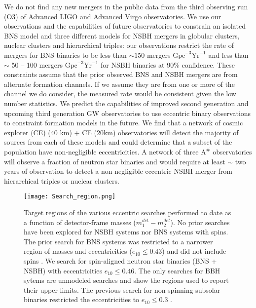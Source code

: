 \documentclass[floatfix,lengthcheck,showpacs,amssymb,amsmath,amsfonts,twocolumn,nofootinbib,longbibliography]{revtex4-1}
\begin{document}
We do not find any new mergers in the public data from the third observing run (O3) of Advanced LIGO and Advanced Virgo observatories. We use our observations and the capabilities of future observatories to constrain an isolated BNS model and three different models for NSBH mergers in globular clusters, nuclear clusters and hierarchical triples: our observations restrict the rate of mergers for BNS binaries to be less than $\sim 150$ mergers $\text{Gpc}^{-3}\text{Yr}^{-1}$ and less than $\sim $ 50 -- 100 mergers $\text{Gpc}^{-3}\text{Yr}^{-1}$ for NSBH binaries at 90\% confidence. These constraints assume that the prior observed BNS and NSBH mergers are from alternate formation channels. If we assume they are from one or more of the channel we do consider, the measured rate would be consistent given the low number statistics. We predict the capabilities of improved second generation and upcoming third generation GW observatories to use eccentric binary observations to constraint formation models in the future. We find that a network of cosmic explorer (CE) (40 km) + CE (20km) observatories will detect the majority of sources from each of these models and could determine that a subset of the population have non-negligible eccentricities. A network of three $\text{A}^{\#}$ observatories will observe a fraction of neutron star binaries and would require at least $\sim$ two years of observation to detect a non-negligible eccentric NSBH merger from hierarchical triples or nuclear clusters.    

\begin{figure}[]
    \centering
    \texttt{[image: Search\_region.png]}
    \caption{ Target regions of the various eccentric searches performed to date \cite{Nitz:2019spj,Nitz:2021vqh,LIGOScientific:2019dag,LIGOScientific:2023lpe} as a function of detector-frame masses ($m_1^{det}-m_2^{det}$). No prior searches have been explored for NSBH systems nor BNS systems with spins. The prior search for BNS systems was restricted to a narrower region of masses and eccentricities ($e_{10} \leq 0.43$) and did not include spins \cite{Nitz:2019spj}. We search for spin-aligned neutron star binaries (BNS + NSBH) with eccentricities $e_{10} \leq 0.46$. The only searches for BBH sytems are unmodeled searches \cite{LIGOScientific:2019dag,LIGOScientific:2023lpe} and show the regions used to report their upper limits. The previous search for non spinning subsolar binaries restricted the eccentricities to $e_{10} \leq 0.3$ \cite{Nitz:2021vqh}.}
    \label{fig:search_region}
\end{figure}
\end{document}
